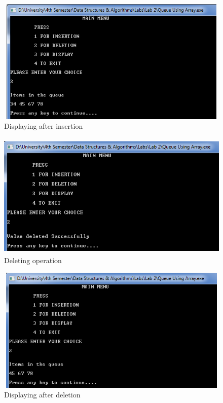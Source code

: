\documentclass[11pt]{article}            %
\begin{document}
\begin{figure}[H]
\centering
  \includegraphics[width=12cm,height=6cm,keepaspectratio]{4.png}
\caption{Displaying after insertion}
\label{Figure:4}    
\end{figure}

\begin{figure}[H]
\centering
  \includegraphics[width=12cm,height=6cm,keepaspectratio]{5.png}
\caption{Deleting operation}
\label{Figure:5}    
\end{figure}

\begin{figure}[H]
\centering
  \includegraphics[width=12cm,height=6cm,keepaspectratio]{6.png}
\caption{Displaying after deletion}
\label{Figure:6}    
\end{figure}
\end{document}
